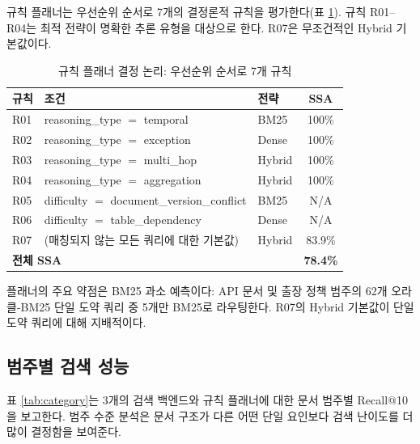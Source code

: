 \documentclass[11pt, a4paper]{article}
\begin{document}
규칙 플래너는 우선순위 순서로 7개의 결정론적 규칙을 평가한다(표 \ref{tab:rules}). 규칙 R01--R04는 최적 전략이 명확한 추론 유형을 대상으로 한다. R07은 무조건적인 Hybrid 기본값이다.

\begin{table}[htbp]
\centering
\caption{규칙 플래너 결정 논리: 우선순위 순서로 7개 규칙}
\label{tab:rules}
\begin{tabular}{lllc}
\toprule
\textbf{규칙} & \textbf{조건} & \textbf{전략} & \textbf{SSA} \\
\midrule
R01 & reasoning\_type $=$ temporal          & BM25   & 100\% \\
R02 & reasoning\_type $=$ exception         & Dense  & 100\% \\
R03 & reasoning\_type $=$ multi\_hop        & Hybrid & 100\% \\
R04 & reasoning\_type $=$ aggregation       & Hybrid & 100\% \\
R05 & difficulty $=$ document\_version\_conflict & BM25 & N/A \\
R06 & difficulty $=$ table\_dependency      & Dense  & N/A  \\
R07 & (매칭되지 않는 모든 쿼리에 대한 기본값) & Hybrid & 83.9\% \\
\midrule
\multicolumn{3}{l}{\textbf{전체 SSA}} & \textbf{78.4\%} \\
\bottomrule
\end{tabular}
\end{table}

플래너의 주요 약점은 BM25 과소 예측이다: API 문서 및 출장 정책 범주의 62개 오라클-BM25 단일 도약 쿼리 중 5개만 BM25로 라우팅한다. R07의 Hybrid 기본값이 단일 도약 쿼리에 대해 지배적이다.

\subsection{범주별 검색 성능}

표 \ref{tab:category}는 3개의 검색 백엔드와 규칙 플래너에 대한 문서 범주별 Recall@10을 보고한다. 범주 수준 분석은 문서 구조가 다른 어떤 단일 요인보다 검색 난이도를 더 많이 결정함을 보여준다.
\end{document}
